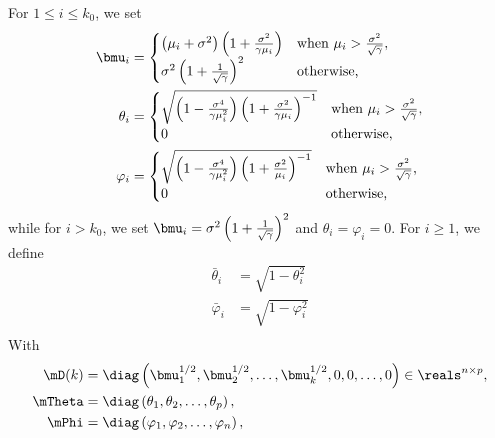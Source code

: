 For $1 \leq i \leq k_0$, we set
\begin{align*}
    \bmu_i
        &=
        \begin{cases}
            \left( \mu_i + \sigma^2 \right)
            \left( 1 + \frac{\sigma^2}{\gamma \mu_i} \right)
                &\text{when $\mu_i > \frac{\sigma^2}{\sqrt{\gamma}}$}, \\
            \sigma^2 \left( 1 + \frac{1}{\sqrt{\gamma}} \right)^2
                &\text{otherwise,}
        \end{cases} \\
    \theta_i 
        &=
        \begin{cases}
            \sqrt{ 
                \left( 1 - \frac{\sigma^4}{ \gamma \mu_i^2} \right) 
                \left( 1 + \frac{\sigma^2}{ \gamma \mu_i  } \right)^{-1} }
            &\text{when $\mu_i > \frac{\sigma^2}{\sqrt{\gamma}}$,} \\
            0
            &\text{otherwise,}
        \end{cases} \\
    \varphi_i
        &=
        \begin{cases}
            \sqrt{
                \left( 1 - \frac{\sigma^4}{ \gamma \mu_i^2} \right)
                \left( 1 + \frac{\sigma^2}{ \mu_i  } \right)^{-1} }
            &\text{when $\mu_i > \frac{\sigma^2}{\sqrt{\gamma}}$,} \\
            0
            &\text{otherwise,}
        \end{cases}
\end{align*}
while for $i > k_0$, we set 
$\bmu_i = \sigma^2 \left( 1 + \frac{1}{\sqrt{\gamma}} \right)^2$ 
and $\theta_i = \varphi_i = 0$.  For $i \geq 1$, we
define
\begin{align*}
    \bar \theta_i  &= \sqrt{ 1 - \theta_i^2 } \\
    \bar \varphi_i &= \sqrt{ 1 - \varphi_i^2 } \\
\end{align*}
With
\begin{align*}
    \mD(k) 
        &= 
            \diag\left( 
                \bmu_1^{1/2}, 
                \bmu_2^{1/2}, 
                \ldots,
                \bmu_k^{1/2},
                0,
                0,
                \ldots,
                0
            \right) \in \reals^{n \times p}, \\
    \mTheta
        &=
            \diag\left(
                \theta_1,
                \theta_2,
                \ldots,
                \theta_p
            \right), \\
    \mPhi
        &=
            \diag\left(
                \varphi_1,
                \varphi_2,
                \ldots,
                \varphi_n
            \right),
\end{align*}
